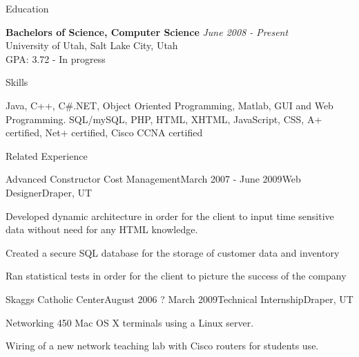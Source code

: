 \documentclass{resume}
\begin{document}
\begin{rSection}{Education}

{\bf Bachelors of Science, Computer Science} \hfill {\em June 2008 - Present} \\ 
University of Utah, Salt Lake City, Utah \\
GPA: 3.72 - In progress

\end{rSection}


\begin{rSection}{Skills}

Java, C++, C\#.NET, Object Oriented Programming, Matlab, GUI and Web Programming. SQL/mySQL, PHP, HTML, XHTML, JavaScript, CSS, A+ certified, Net+ certified, Cisco CCNA certified

\end{rSection}


\begin{rSection}{Related Experience}

\begin{rSubsection}{Advanced Constructor Cost Management}{March 2007 - June 2009}{Web Designer}{Draper, UT}
\item Developed dynamic architecture in order for the client to input time sensitive data without need for any HTML knowledge.
\item Created a secure SQL database for the storage of customer data and inventory
\item Ran statistical tests in order for the client to picture the success of the company
\end{rSubsection}


\begin{rSubsection}{Skaggs Catholic Center}{August 2006 ? March 2009}{Technical Internship}{Draper, UT}
\item Networking 450 Mac OS X terminals using a Linux server.
\item Wiring of a new network teaching lab with Cisco routers for students use.
\end{rSubsection}

\end{rSection}
\end{document}
